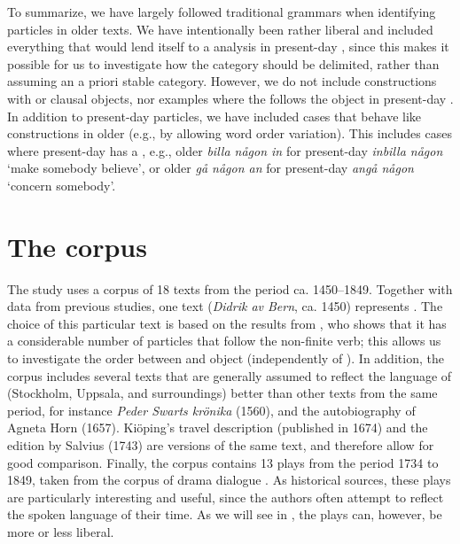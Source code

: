 \documentclass[output=paper]{langscibook}
\begin{document}
To summarize, we have largely followed traditional  grammars when identifying particles in older  texts. We have intentionally been rather liberal and included everything that would lend itself to a  analysis in present-day , since this makes it possible for us to investigate how the  category should be delimited, rather than assuming an a priori stable category. However, we do not include constructions with  or clausal objects, nor examples where the  follows the object in present-day . In addition to present-day  particles, we have included cases that behave like  constructions in older  (e.g., by allowing word order variation). This includes cases where present-day  has a , e.g., older  \textit{billa någon in} for present-day \textit{inbilla någon} ‘make somebody believe’, or older \textit{gå någon an} for present-day \textit{angå någon} ‘concern somebody’.


\section{The corpus}\label{sec:lalu:3}


The study uses a corpus of 18 texts from the period ca. 1450–1849. Together with data from previous studies, one text (\textit{Didrik av Bern}, ca. 1450) represents . The choice of this particular text is based on the results from \citet{Ljunggren1932}, who shows that it has a considerable number of particles that follow the non-finite verb; this allows us to investigate the order between  and object (independently of ). In addition, the corpus includes several texts that are generally assumed to reflect the language of  (Stockholm, Uppsala, and surroundings) better than other texts from the same period, for instance \textit{Peder Swarts krönika} (1560), and the autobiography of Agneta Horn (1657). Kiöping’s travel description (published in 1674) and the edition by Salvius (1743) are versions of the same text, and therefore allow for good comparison. Finally, the corpus contains 13 plays from the period 1734 to 1849, taken from the corpus of  drama dialogue \citep{MarttalaStromquist2001}. As historical sources, these plays are particularly interesting and useful, since the authors often attempt to reflect the spoken language of their time. As we will see in , the plays can, however, be more or less liberal.
\end{document}
